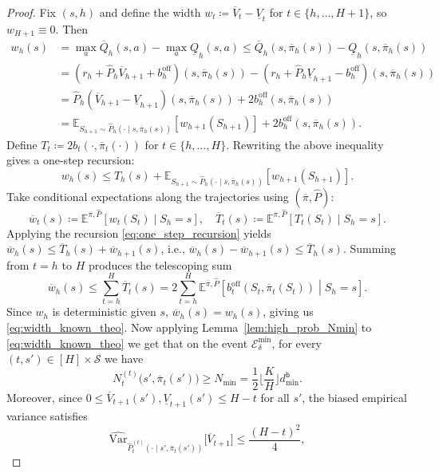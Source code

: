 \documentclass[twoside]{article}
\newcommand{\off}{\mathrm{off}} %
\newcommand{\boff}{b_h^{\off}} %
\newcommand{\boffp}[1]{b_{#1}^{\off}} %
\newcommand{\ovpihs}{\overline{\pi}_h(s)} %
\newcommand{\ohighv}{\overline{V}} %
\newcommand{\olowv}{\underline{V}} %
\newcommand{\ohighq}{\overline{Q}} %
\newcommand{\olowq}{\underline{Q}} %
\begin{document}
\begin{proof}
Fix $(s,h)$ and define the width $w_t\coloneqq \ohighv_t-\olowv_t$ for $t\in\{h,\dots,H+1\}$, so $w_{H+1}\equiv 0$. 
Then
\begin{align*}
w_h(s)
&= \max_{a}\ohighq_h(s,a)-\max_{a}\olowq_h(s,a)
\le \ohighq_h(s,\ovpihs)-\olowq_h(s,\ovpihs)\\
&= \left(r_h+\widehat{P}_h\ohighv_{h+1}+\boff\right)(s,\ovpihs)
 - \left(r_h+\widehat{P}_h\olowv_{h+1}-\boff\right)(s,\ovpihs)\\
&= \widehat{P}_h\left(\ohighv_{h+1}-\olowv_{h+1}\right)(s,\ovpihs) + 2\boff\left(s,\ovpihs\right)\\
&= \mathbb{E}_{S_{h+1}\sim \widehat{P}_h(\cdot\mid s,\ovpihs)}\left[w_{h+1}(S_{h+1})\right]
 + 2\boff\left(s,\overline{\pi}_h(s)\right).
\end{align*}
Define $T_t\coloneqq 2b_t\left(\cdot,\overline{\pi}_t(\cdot)\right)$ for $t\in\{h,\dots,H\}$. Rewriting the above inequality gives a one-step recursion:
\begin{equation}
\label{eq:one_step_recursion}
w_h(s)\le T_h(s)+\mathbb{E}_{S_{h+1}\sim \widehat{P}_h(\cdot\mid s,\overline{\pi}_h(s))}\left[w_{h+1}(S_{h+1})\right].
\end{equation}
Take conditional expectations along the trajectories using $(\overline{\pi},\widehat{P})$:
\[
\overline{w}_t(s)\coloneqq \mathbb{E}^{\overline{\pi},\widehat{P}}\left[w_t(S_t)\mid S_h=s\right],\quad
\overline{T}_t(s)\coloneqq \mathbb{E}^{\overline{\pi},\widehat{P}}\left[T_t(S_t)\mid S_h=s\right].
\]
Applying the recursion \eqref{eq:one_step_recursion} yields
$\overline{w}_h(s)\le \overline{T}_h(s)+\overline{w}_{h+1}(s)$, i.e., $\overline{w}_h(s)-\overline{w}_{h+1}(s)\le \overline{T}_h(s)$.
Summing from $t=h$ to $H$ produces the telescoping sum
\[
\overline{w}_h(s)\le\sum_{t=h}^{H}\overline{T}_t(s)
=2\sum_{t=h}^{H}\mathbb{E}^{\overline{\pi},\widehat{P}}\left[
\boffp{t}\left(S_t,\overline{\pi}_t(S_t)\right)\middle| S_h=s
\right].
\]
Since $w_h$ is deterministic given $s$, $\overline{w}_h(s)=w_h(s)$, giving us \eqref{eq:width_known_theo}. Now applying Lemma~\ref{lem:high_prob_Nmin} to \eqref{eq:width_known_theo} we get that on the event $\mathcal{E}^{\mathrm{min}}_\delta$, for every $(t,s')\in[H]\times\mathcal{S}$ we have
\[
N_t^{(t)}\big(s',\overline{\pi}_t(s')\big)\ge N_{\min}=\frac{1}{2}\Big\lfloor\frac{K}{H}\Big\rfloor d^{\mathsf{b}}_{\min}.
\]
Moreover, since $0\le \ohighv_{t+1}(s'),\olowv_{t+1}(s')\le H-t$ for all $s'$, the biased empirical variance satisfies
\[
\widehat{\mathrm{Var}}_{\widehat{P}^{(t)}_t(\cdot\mid s',\overline{\pi}_t(s'))}\big[\ohighv_{t+1}\big]\le \dfrac{(H-t)^2}{4},
\]
\end{proof}
\end{document}
